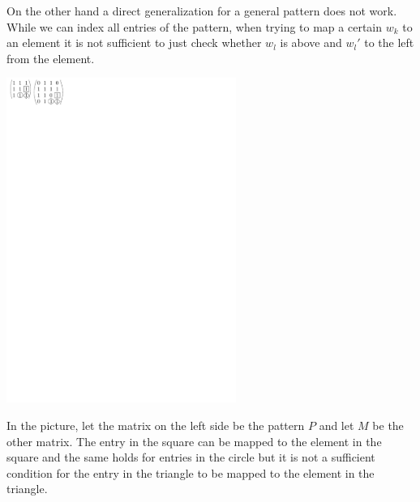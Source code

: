 On the other hand a direct generalization for a general pattern does not work. While we can index all entries of the pattern, when trying to map a certain $w_k$ to an element it is not sufficient to just check whether $w_l$ is above and $w_l'$ to the left from the element.

\centerline{\mbox{\includegraphics[width=75mm]{../img/nogeneral.pdf}}}

In the picture, let the matrix on the left side be the pattern $P$ and let $M$ be the other matrix. The entry in the square can be mapped to the element in the square and the same holds for entries in the circle but it is not a sufficient condition for the entry in the triangle to be mapped to the element in the triangle.